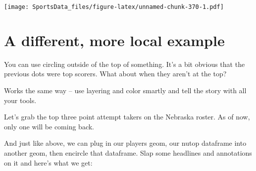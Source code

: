\documentclass[
]{book}
\newenvironment{Shaded}{\begin{snugshade}}{\end{snugshade}}
\newcommand{\DataTypeTok}[1]{\textcolor[rgb]{0.13,0.29,0.53}{#1}}
\newcommand{\DecValTok}[1]{\textcolor[rgb]{0.00,0.00,0.81}{#1}}
\newcommand{\KeywordTok}[1]{\textcolor[rgb]{0.13,0.29,0.53}{\textbf{#1}}}
\newcommand{\NormalTok}[1]{#1}
\newcommand{\OperatorTok}[1]{\textcolor[rgb]{0.81,0.36,0.00}{\textbf{#1}}}
\newcommand{\StringTok}[1]{\textcolor[rgb]{0.31,0.60,0.02}{#1}}
\begin{document}
\texttt{[image: SportsData\_files/figure-latex/unnamed-chunk-370-1.pdf]}

\hypertarget{a-different-more-local-example}{%
\section{A different, more local example}\label{a-different-more-local-example}}

You can use circling outside of the top of something. It's a bit obvious that the previous dots were top scorers. What about when they aren't at the top?

Works the same way -- use layering and color smartly and tell the story with all your tools.

Let's grab the top three point attempt takers on the Nebraska roster. As of now, only one will be coming back.

\begin{Shaded}
\end{Shaded}

And just like above, we can plug in our players geom, our nutop dataframe into another geom, then encircle that dataframe. Slap some headlines and annotations on it and here's what we get:
\end{document}
